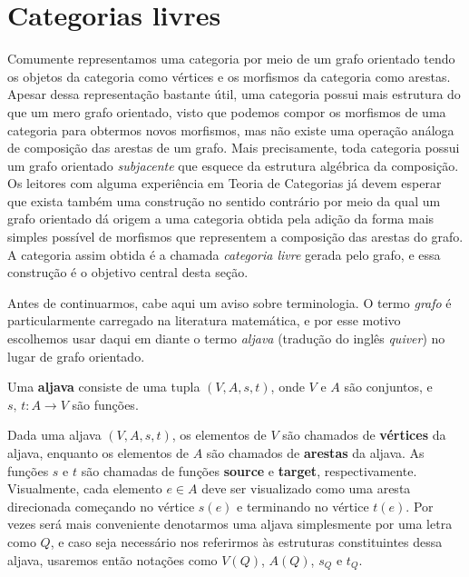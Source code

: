 \section{Categorias livres}


Comumente representamos uma categoria por meio de um grafo orientado tendo os objetos da categoria como vértices e os morfismos da categoria como arestas.
Apesar dessa representação bastante útil, uma categoria possui mais estrutura do que um mero grafo orientado, visto que podemos compor os morfismos de uma categoria para obtermos novos morfismos, mas não existe uma operação análoga de composição das arestas de um grafo.
Mais precisamente, toda categoria possui um grafo orientado \emph{subjacente} que esquece da estrutura algébrica da composição.
Os leitores com alguma experiência em Teoria de Categorias já devem esperar que exista também uma construção no sentido contrário por meio da qual um grafo orientado dá origem a uma categoria obtida pela adição da forma mais simples possível de morfismos que representem a composição das arestas do grafo.
A categoria assim obtida é a chamada \emph{categoria livre} gerada pelo grafo, e essa construção é o objetivo central desta seção.

Antes de continuarmos, cabe aqui um aviso sobre terminologia.
O termo \emph{grafo} é particularmente carregado na literatura matemática, e por esse motivo escolhemos usar daqui em diante o termo \emph{aljava} (tradução do inglês \emph{quiver}) no lugar de grafo orientado.

\begin{defin}\label{defin:aljava}
    Uma \textbf{aljava} consiste de uma tupla $(V,A,s,t)$, onde $V$ e $A$ são conjuntos, e $s,\,t: A \to V$ são funções.
\end{defin}

Dada uma aljava $(V,A,s,t)$, os elementos de $V$ são chamados de \textbf{vértices} da aljava, enquanto os elementos de $A$ são chamados de \textbf{arestas} da aljava.
As funções $s$ e $t$ são chamadas de funções \textbf{source} e \textbf{target}, respectivamente.
Visualmente, cada elemento $e \in A$ deve ser visualizado como uma aresta direcionada começando no vértice $s(e)$ e terminando no vértice $t(e)$.
Por vezes será mais conveniente denotarmos uma aljava simplesmente por uma letra como $Q$, e caso seja necessário nos referirmos às estruturas constituintes dessa aljava, usaremos então notações como $V(Q)$, $A(Q)$, $s_Q$ e $t_Q$.

